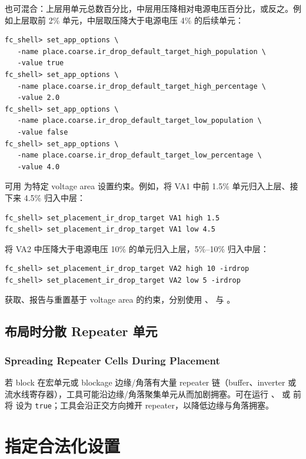 也可混合：上层用单元总数百分比，中层用压降相对电源电压百分比，或反之。例如上层取前 2\% 单元，中层取压降大于电源电压 4\% 的后续单元：
\begin{lstlisting}
fc_shell> set_app_options \
   -name place.coarse.ir_drop_default_target_high_population \
   -value true
fc_shell> set_app_options \
   -name place.coarse.ir_drop_default_target_high_percentage \
   -value 2.0
fc_shell> set_app_options \
   -name place.coarse.ir_drop_default_target_low_population \
   -value false
fc_shell> set_app_options \
   -name place.coarse.ir_drop_default_target_low_percentage \
   -value 4.0
\end{lstlisting}

可用  为特定 voltage area 设置约束。例如，将 VA1 中前 1.5\% 单元归入上层、接下来 4.5\% 归入中层：
\begin{lstlisting}
fc_shell> set_placement_ir_drop_target VA1 high 1.5
fc_shell> set_placement_ir_drop_target VA1 low 4.5
\end{lstlisting}

将 VA2 中压降大于电源电压 10\% 的单元归入上层，5\%--10\% 归入中层：
\begin{lstlisting}
fc_shell> set_placement_ir_drop_target VA2 high 10 -irdrop
fc_shell> set_placement_ir_drop_target VA2 low 5 -irdrop
\end{lstlisting}

获取、报告与重置基于 voltage area 的约束，分别使用 、 与 。

\subsection{布局时分散 Repeater 单元}
\subsubsection*{Spreading Repeater Cells During Placement}

若 block 在宏单元或 blockage 边缘/角落有大量 repeater 链（buffer、inverter 或流水线寄存器），工具可能沿边缘/角落聚集单元从而加剧拥塞。可在运行 、 或  前将  设为 \texttt{true}；工具会沿正交方向摊开 repeater，以降低边缘与角落拥塞。

\section{指定合法化设置}
